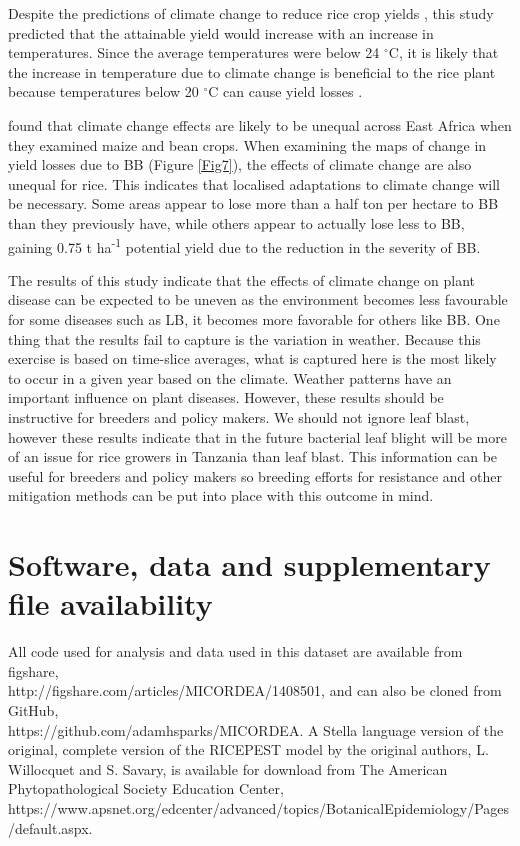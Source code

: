     Despite the predictions of climate change to reduce rice crop yields \citep{Parry2004, Peng2004}, this study predicted that the attainable yield would increase with an increase in temperatures. Since the average temperatures were below 24 $^{\circ}$C, it is likely that the increase in temperature due to climate change is beneficial to the rice plant because temperatures below 20 $^{\circ}$C can cause yield losses \citep{Yoshida}.
            
    \citet{Thornton2009} found that climate change effects are likely to be unequal across East Africa when they examined maize and bean crops. When examining the maps of change in yield losses due to BB (Figure \ref{Fig7}), the effects of climate change are also unequal for rice. This indicates that localised adaptations to climate change will be necessary. Some areas appear to lose more than a half ton per hectare to BB than they previously have, while others appear to actually lose less to BB, gaining 0.75 t ha\textsuperscript{-1} potential yield due to the reduction in the severity of BB.
    
    The results of this study indicate that the effects of climate change on plant disease can be expected to be uneven as the environment becomes less favourable for some diseases such as LB, it becomes more favorable for others like BB. One thing that the results fail to capture is the variation in weather. Because this exercise is based on time-slice averages, what is captured here is the most likely to occur in a given year based on the climate. Weather patterns have an important influence on plant diseases. However, these results should be instructive for breeders and policy makers. We should not ignore leaf blast, however these results indicate that in the future bacterial leaf blight will be more of an issue for rice growers in Tanzania than leaf blast. This information can be useful for breeders and policy makers so breeding efforts for resistance and other mitigation methods can be put into place with this outcome in mind.
    
\section{Software, data and supplementary file availability}
\label{software_and_data_availability}
All code used for analysis and data used in this dataset are available from figshare,\\ http://figshare.com/articles/MICORDEA/1408501, and can also be cloned from GitHub,\\https://github.com/adamhsparks/MICORDEA. A Stella language version of the original, complete version of the RICEPEST model by the original authors, L. Willocquet and S. Savary, is available for download from The American Phytopathological Society Education Center,\\
https://www.apsnet.org/edcenter/advanced/topics/BotanicalEpidemiology/Pages/default.aspx.

